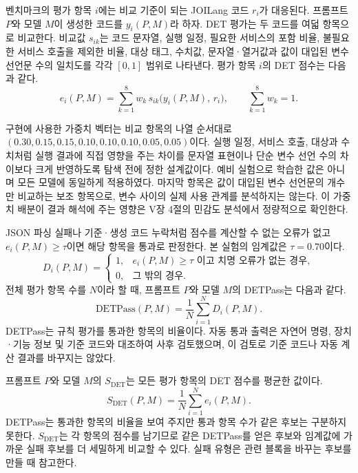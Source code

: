 \documentclass[10pt,twocolumn]{article}
\newcommand{\sdet}{\ensuremath{S_{\mathrm{DET}}}}
\newenvironment{revision}{\begingroup\color{revisionblue}}{\endgroup}
\begin{document}
\begin{revision}
벤치마크의 평가 항목 $i$에는 비교 기준이 되는 JOILang 코드 $r_i$가 대응된다. 프롬프트 $P$와 모델 $M$이 생성한 코드를 $y_i(P,M)$라 하자. DET 평가는 두 코드를 여덟 항목으로 비교한다. 비교값 $s_{ik}$는 코드 문자열, 실행 일정, 필요한 서비스의 포함 비율, 불필요한 서비스 호출을 제외한 비율, 대상 태그, 수치값, 문자열·열거값과 값이 대입된 변수 선언문 수의 일치도를 각각 $[0,1]$ 범위로 나타낸다. 평가 항목 $i$의 DET 점수는 다음과 같다.
\begin{equation}
e_i(P,M) = \sum_{k=1}^{8} w_k\, s_{ik}\bigl(y_i(P,M),\, r_i\bigr), \qquad \sum_{k=1}^{8} w_k = 1.
\label{eq:det_ei}
\end{equation}

구현에 사용한 가중치 벡터는 비교 항목의 나열 순서대로 $(0.30, 0.15, 0.15, 0.10, 0.10, 0.10, 0.05, 0.05)$이다. 실행 일정, 서비스 호출, 대상과 수치처럼 실행 결과에 직접 영향을 주는 차이를 문자열 표현이나 단순 변수 선언 수의 차이보다 크게 반영하도록 탐색 전에 정한 설계값이다. 예비 실험으로 학습한 값은 아니며 모든 모델에 동일하게 적용하였다. 마지막 항목은 값이 대입된 변수 선언문의 개수만 비교하는 보조 항목으로, 변수 사이의 실제 사용 관계를 분석하지는 않는다. 이 가중치 배분이 결과 해석에 주는 영향은 V장 4절의 민감도 분석에서 정량적으로 확인한다.

JSON 파싱 실패나 기준·생성 코드 누락처럼 점수를 계산할 수 없는 오류가 없고 $e_i(P,M) \geq \tau$이면 해당 항목을 통과로 판정한다. 본 실험의 임계값은 $\tau = 0.70$이다.
\begin{equation}
D_i(P,M) =
\begin{cases}
1, & e_i(P,M) \geq \tau \text{ 이고 치명 오류가 없는 경우},\\
0, & \text{그 밖의 경우}.
\end{cases}
\label{eq:det_pass_indicator}
\end{equation}
전체 평가 항목 수를 $N$이라 할 때, 프롬프트 $P$와 모델 $M$의 DETPass는 다음과 같다.
\begin{equation}
\mathrm{DETPass}(P,M)=\frac{1}{N}\sum_{i=1}^{N}D_i(P,M).
\label{eq:detpass}
\end{equation}
DETPass는 규칙 평가를 통과한 항목의 비율이다. 자동 통과 출력은 자연어 명령, 장치·기능 정보 및 기준 코드와 대조하여 사후 검토했으며, 이 검토로 기준 코드나 자동 계산 결과를 바꾸지는 않았다.

프롬프트 $P$와 모델 $M$의 \sdet{}는 모든 평가 항목의 DET 점수를 평균한 값이다.
\begin{equation}
\sdet(P,M)=\frac{1}{N}\sum_{i=1}^{N}e_i(P,M).
\label{eq:sdet}
\end{equation}
DETPass는 통과한 항목의 비율을 보여 주지만 통과 항목 수가 같은 후보는 구분하지 못한다. \sdet{}는 각 항목의 점수를 남기므로 같은 DETPass를 얻은 후보와 임계값에 가까운 실패 후보를 더 세밀하게 비교할 수 있다. 실패 유형은 관련 블록을 바꾸는 후보를 만들 때 참고한다.


\end{revision}
\end{document}
